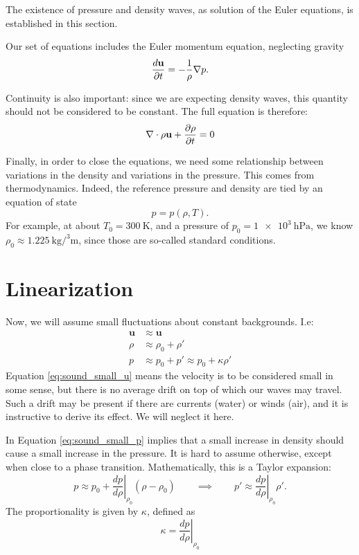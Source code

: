 \label{sec:sound_waves}

The existence of pressure and density waves, as solution of the Euler
equations, is established in this section.

Our set of equations includes the Euler momentum equation, neglecting
gravity
\[
\frac{d \mathbf{u} }{\partial t}= - \frac{1}{\rho} \nabla p  .
\]

Continuity is also important: since we are expecting density waves,
this quantity should not be considered to be constant. The full
equation is therefore:
\[
\nabla \cdot \rho \mathbf{u} + \frac{\partial \rho}{\partial t} =0
\]

Finally, in order to close the equations, we need some relationship
between variations in the density and variations in the pressure. This
comes from thermodynamics. Indeed, the reference pressure and density
are tied by an equation of state
\[
p=p(\rho,T) .\] For example, at about $T_0=\SI{300}{\kelvin}$, and a
pressure of $p_0=\SI{1e3}{\hecto\pascal}$, we know
$\rho_0\approx\SI{1.225}{\kilo\gram\per\cubed\meter}$, since those are
so-called standard conditions.

\section{Linearization}

Now, we will assume small fluctuations about constant backgrounds. I.e:
\begin{align}
  \label{eq:sound_small_u}
  \mathbf{u} & \approx \mathbf{u} \\
  \label{eq:sound_small_rho}
  \rho       & \approx \rho_0 + \rho' \\
  \label{eq:sound_small_p}
  p          & \approx p_0+ p' \approx p_0+ \kappa \rho'
\end{align}
Equation \ref{eq:sound_small_u} means the velocity is to be considered
small in some sense, but there is no average drift on top of which our
waves may travel. Such a drift may be present if there are currents
(water) or winds (air), and it is instructive to derive its effect. We
will neglect it here.

In Equation \ref{eq:sound_small_p} implies that a small increase in
density should cause a small increase in the pressure. It is hard to
assume otherwise, except when close to a phase
transition. Mathematically, this is a Taylor expansion:
\[
p \approx
p_0 +
\left. \frac{d p}{d\rho} \right|_{\rho_0} (\rho-\rho_0)
\qquad\implies\qquad
p' \approx \left. \frac{d p}{d\rho} \right|_{\rho_0} \rho' .
\]
The proportionality is given by $\kappa$, defined as
\begin{equation}
  \label{eq:sound_kappa}
  \kappa =  \left. \frac{d p}{d\rho} \right|_{\rho_0} 
\end{equation}

